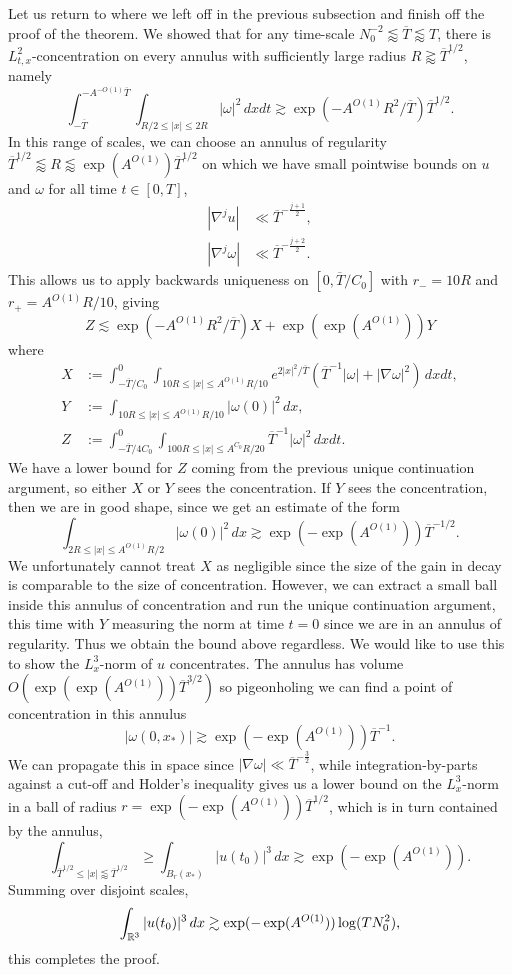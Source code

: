 Let us return to where we left off in the previous subsection and finish off the proof of the theorem. We showed that for any time-scale $N_0^{-2} \lessapprox \overline T \lessapprox T$, there is $L^2_{t, x}$-concentration on every annulus with sufficiently large radius $R \gtrapprox \overline T^{1/2}$, namely
\[
		\int_{-\overline T}^{-A^{-O(1)} \overline T} \int_{R/2 \leq |x| \leq 2R} |\omega|^2 \, dx dt \gtrsim \exp (-A^{O(1)} R^2/\overline T) \overline T^{1/2}.
	\]
In this range of scales, we can choose an annulus of regularity $\overline T^{1/2} \lessapprox R \lessapprox \exp(A^{O(1)}) \overline T^{1/2}$ on which we have small pointwise bounds on $u$ and $\omega$ for all time $t \in [0, T]$, 
	\begin{align*}
		|\nabla^j u|
			&\ll \overline T^{-\frac{j + 1}{2}}, \\
		|\nabla^j \omega |
			&\ll \overline T^{-\frac{j + 2}{2}}	.
	\end{align*}
This allows us to apply backwards uniqueness on $[0, \overline T/C_0]$ with $r_- = 10R$ and $r_+ = A^{O(1)} R/10$, giving
	\[
		Z \lesssim \exp (-A^{O(1)} R^2/ \overline T) X + \exp (\exp (A^{O(1)})) Y
	\]
where
	\begin{align*}
		X
			&:= \int_{-\overline T/C_0}^0  \int_{10 R \leq |x| \leq A^{O(1)} R/10} e^{2|x|^2/\overline T} (\overline T^{-1} |\omega| + |\nabla \omega|^2) \, dx dt, \\
		Y
			&:= \int_{10 R \leq |x| \leq A^{O(1)} R/10} |\omega(0)|^2 \, dx ,\\
		Z
			&:= \int_{-\overline T/4C_0}^0 \int_{100 R \leq |x| \leq A^{C_0} R/20} \overline T^{-1} |\omega|^2 \, dx dt.
	\end{align*}
We have a lower bound for $Z$ coming from the previous unique continuation argument, so either $X$ or $Y$ sees the concentration. If $Y$ sees the concentration, then we are in good shape, since we get an estimate of the form 
	\[
		\int_{2R \leq |x| \leq A^{O(1)} R/2} |\omega(0)|^2 \, dx \gtrsim \exp (- \exp (A^{O(1)}) ) \overline T^{-1/2}.
	\]
We unfortunately cannot treat $X$ as negligible since the size of the gain in decay is comparable to the size of concentration. However, we can extract a small ball inside this annulus of concentration and run the unique continuation argument, this time with $Y$ measuring the norm at time $t = 0$ since we are in an annulus of regularity. Thus we obtain the bound above regardless. We would like to use this to show the $L^3_x$-norm of $u$ concentrates. The annulus has volume $O(\exp (\exp (A^{O(1)})) \overline T^{3/2})$ so pigeonholing we can find a point of concentration in this annulus
	\[
		|\omega(0, x_*)| \gtrsim  \exp (- \exp (A^{O(1)}) ) \overline T^{-1}.
	\]
We can propagate this in space since $|\nabla \omega |
\ll \overline T^{-\frac{3}{2}}$, while integration-by-parts against a cut-off and Holder's inequality gives us a lower bound on the $L^3_x$-norm in a ball of radius $r = \exp(-\exp(A^{O(1)})) \overline T^{1/2}$, which is in turn contained by the annulus, 
	\[
		\int_{\overline T^{1/2} \leq |x| \lessapprox \overline T^{1/2}} \geq \int_{B_r (x_*)} |u(t_0)|^3 \, dx \gtrsim \exp (-\exp(A^{O(1)})).
	\]
Summing over disjoint scales,
	\[
		\int_{\mathbb R^3} |u(t_0)|^3 \, dx \gtrsim  \exp (-\exp(A^{O(1)}))\log(TN_0^2),
	\]
this completes the proof. 	
